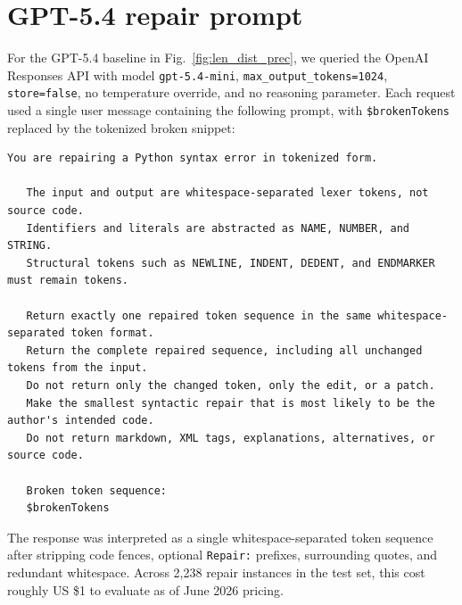 \documentclass[popl.tex]{subfiles}
\begin{document}
\section{GPT-5.4 repair prompt}\label{sec:chatgpt-prompt}

For the GPT-5.4 baseline in Fig.~\ref{fig:len_dist_prec}, we queried the OpenAI Responses API with model \texttt{gpt-5.4-mini}, \texttt{max\_output\_tokens=1024}, \texttt{store=false}, no temperature override, and no reasoning parameter. Each request used a single user message containing the following prompt, with \texttt{\$brokenTokens} replaced by the tokenized broken snippet:

\begin{lstlisting}[basicstyle=\ttfamily\scriptsize,breaklines=true]
   You are repairing a Python syntax error in tokenized form.

   The input and output are whitespace-separated lexer tokens, not source code.
   Identifiers and literals are abstracted as NAME, NUMBER, and STRING.
   Structural tokens such as NEWLINE, INDENT, DEDENT, and ENDMARKER must remain tokens.

   Return exactly one repaired token sequence in the same whitespace-separated token format.
   Return the complete repaired sequence, including all unchanged tokens from the input.
   Do not return only the changed token, only the edit, or a patch.
   Make the smallest syntactic repair that is most likely to be the author's intended code.
   Do not return markdown, XML tags, explanations, alternatives, or source code.

   Broken token sequence:
   $brokenTokens
\end{lstlisting}

The response was interpreted as a single whitespace-separated token sequence after stripping code fences, optional \texttt{Repair:} prefixes, surrounding quotes, and redundant whitespace. Across 2,238 repair instances in the test set, this cost roughly US \$1 to evaluate as of June 2026 pricing.
\ifSubfilesClassLoaded{\par\clearpage}{}
\end{document}
